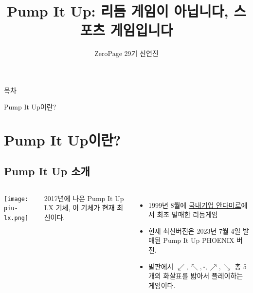 \documentclass{beamer}
\title{Pump It Up: 리듬 게임이 아닙니다, 스포츠 게임입니다}
\author{ZeroPage 29기 신연진}
\begin{document}
\frame{\titlepage}

\begin{frame}{목차}
	\tableofcontents
\end{frame}

\begin{frame}{Pump It Up이란?}
	\section{Pump It Up이란?}
	\subsection{Pump It Up 소개}

	\begin{columns}
			\texttt{[image: piu-lx.png]}	

			\begin{center}
				\small{2017년에 나온 Pump It Up LX 기체, 이 기체가 현재 최신이다.}
			\end{center}
		\begin{itemize}
			\item 1999년 8월에 \href{https://www.andamiro.com}{국내기업 안다미로}에서 최초 발매한 리듬게임
			\item 현재 최신버전은 2023년 7월 4일 발매된 Pump It Up PHOENIX 버전.
			\item 발판에서 $ \swarrow, \nwarrow, \square, \nearrow, \searrow $ 총 5개의 화살표를 밟아서 플레이하는 게임이다.
		\end{itemize}	
	\end{columns}
\end{frame}
\end{document}
